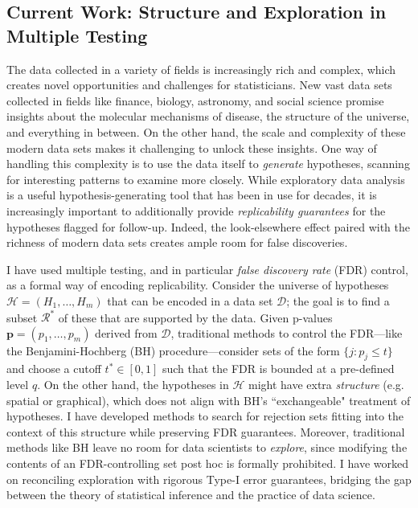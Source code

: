 \documentclass[11pt]{article}
\newcommand{\cR}{\mathcal R}
\begin{document}
\subsection*{Current Work: Structure and Exploration in Multiple Testing}

The data collected in a variety of fields is increasingly rich and complex, which creates novel opportunities and challenges for statisticians. New vast data sets collected in fields like finance, biology, astronomy, and social science promise insights about the molecular mechanisms of disease, the structure of the universe, and everything in between. On the other hand, the scale and complexity of these modern data sets makes it challenging to unlock these insights. One way of handling this complexity is to use the data itself to \textit{generate} hypotheses, scanning for interesting patterns to examine more closely. While exploratory data analysis is a useful hypothesis-generating tool that has been in use for decades, it is increasingly important to additionally provide \textit{replicability guarantees} for the hypotheses flagged for follow-up. Indeed, the look-elsewhere effect paired with the richness of modern data sets creates ample room for false discoveries. 

I have used multiple testing, and in particular \textit{false discovery rate} (FDR) control, as a formal way of encoding replicability. Consider the universe of hypotheses $\mathcal H = (H_1, \dots, H_m)$ that can be encoded in a data set $\mathcal D$; the goal is to find a subset $\cR^*$ of these that are supported by the data. Given p-values $\bm p = (p_1, \dots, p_m)$ derived from $\mathcal D$, traditional methods to control the FDR---like the Benjamini-Hochberg (BH) procedure---consider sets of the form $\{j: p_j \leq t\}$ and choose a cutoff $t^* \in [0,1]$ such that the FDR is bounded at a pre-defined level $q$. On the other hand, the hypotheses in $\mathcal H$ might have extra \textit{structure} (e.g. spatial or graphical), which does not align with BH's ``exchangeable" treatment of hypotheses. I have developed methods to search for rejection sets fitting into the context of this structure while preserving FDR guarantees. Moreover, traditional methods like BH leave no room for data scientists to \textit{explore}, since modifying the contents of an FDR-controlling set post hoc is formally prohibited. I have worked on reconciling exploration with rigorous Type-I error guarantees, bridging the gap between the theory of statistical inference and the practice of data science.
\end{document}
